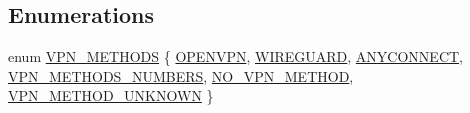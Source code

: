 \subsection*{Enumerations}
\begin{DoxyCompactItemize}
\item 
enum \hyperlink{route-tree_8h_a5b876670828c4e38106ba1c6d91024b7}{V\+P\+N\+\_\+\+M\+E\+T\+H\+O\+DS} \{ \newline
\hyperlink{route-tree_8h_a5b876670828c4e38106ba1c6d91024b7ab1ae185eb0d77c55896e16a13cc83fcd}{O\+P\+E\+N\+V\+PN}, 
\hyperlink{route-tree_8h_a5b876670828c4e38106ba1c6d91024b7a16a826749e7c59a1ac398c5fea811044}{W\+I\+R\+E\+G\+U\+A\+RD}, 
\hyperlink{route-tree_8h_a5b876670828c4e38106ba1c6d91024b7ac610d0f8eb941cb8d8a5a1e30f60ea1b}{A\+N\+Y\+C\+O\+N\+N\+E\+CT}, 
\hyperlink{route-tree_8h_a5b876670828c4e38106ba1c6d91024b7a12890d8b7f1c543c687d8d72ce33d749}{V\+P\+N\+\_\+\+M\+E\+T\+H\+O\+D\+S\+\_\+\+N\+U\+M\+B\+E\+RS}, 
\newline
\hyperlink{route-tree_8h_a5b876670828c4e38106ba1c6d91024b7a096310080aa42637b2920b2e9e78aacd}{N\+O\+\_\+\+V\+P\+N\+\_\+\+M\+E\+T\+H\+OD}, 
\hyperlink{route-tree_8h_a5b876670828c4e38106ba1c6d91024b7a7df79fc150333242d7a3df021b1b2206}{V\+P\+N\+\_\+\+M\+E\+T\+H\+O\+D\+\_\+\+U\+N\+K\+N\+O\+WN}
 \}
\end{DoxyCompactItemize}
